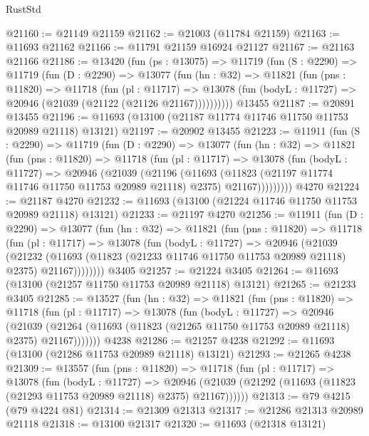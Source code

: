 \begin{lexlean}{RustStd}
\begin{coremodule}
@21160 := @21149 @21159
@21162 := @21003 (@11784 @21159)
@21163 := @11693 @21162
@21166 := @11791 @21159 @16924 @21127
@21167 := @21163 @21166
@21186 := @13420
    (fun (ps : @13075) =>
    @11719
      (fun (S : @2290) =>
      @11719
        (fun (D : @2290) =>
        @13077
          (fun (hn : @32) =>
          @11821
            (fun (pns : @11820) =>
            @11718
              (fun (pl : @11717) =>
              @13078 (fun (bodyL : @11727) => @20946 (@21039 (@21122 (@21126 @21167))))))))))
    @13455
@21187 := @20891 @13455
@21196 := @11693 (@13100 (@21187 @11774 @11746 @11750 @11753 @20989 @21118) @13121)
@21197 := @20902 @13455
@21223 := @11911
    (fun (S : @2290) =>
    @11719
      (fun (D : @2290) =>
      @13077
        (fun (hn : @32) =>
        @11821
          (fun (pns : @11820) =>
          @11718
            (fun (pl : @11717) =>
            @13078
              (fun (bodyL : @11727) =>
              @20946
                (@21039
                  (@21196
                    (@11693
                      (@11823 (@21197 @11774 @11746 @11750 @11753 @20989 @21118) @2375)
                      @21167)))))))))
    @4270
@21224 := @21187 @4270
@21232 := @11693 (@13100 (@21224 @11746 @11750 @11753 @20989 @21118) @13121)
@21233 := @21197 @4270
@21256 := @11911
    (fun (D : @2290) =>
    @13077
      (fun (hn : @32) =>
      @11821
        (fun (pns : @11820) =>
        @11718
          (fun (pl : @11717) =>
          @13078
            (fun (bodyL : @11727) =>
            @20946
              (@21039
                (@21232
                  (@11693 (@11823 (@21233 @11746 @11750 @11753 @20989 @21118) @2375) @21167))))))))
    @3405
@21257 := @21224 @3405
@21264 := @11693 (@13100 (@21257 @11750 @11753 @20989 @21118) @13121)
@21265 := @21233 @3405
@21285 := @13527
    (fun (hn : @32) =>
    @11821
      (fun (pns : @11820) =>
      @11718
        (fun (pl : @11717) =>
        @13078
          (fun (bodyL : @11727) =>
          @20946
            (@21039
              (@21264 (@11693 (@11823 (@21265 @11750 @11753 @20989 @21118) @2375) @21167)))))))
    @4238
@21286 := @21257 @4238
@21292 := @11693 (@13100 (@21286 @11753 @20989 @21118) @13121)
@21293 := @21265 @4238
@21309 := @13557
    (fun (pns : @11820) =>
    @11718
      (fun (pl : @11717) =>
      @13078
        (fun (bodyL : @11727) =>
        @20946 (@21039 (@21292 (@11693 (@11823 (@21293 @11753 @20989 @21118) @2375) @21167))))))
@21313 := @79 @4215 (@79 @4224 @81)
@21314 := @21309 @21313
@21317 := @21286 @21313 @20989 @21118
@21318 := @13100 @21317
@21320 := @11693 (@21318 @13121)

\end{coremodule}
\end{lexlean}
